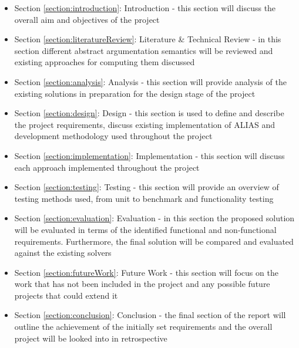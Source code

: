 \begin{itemize}
	\item Section \ref{section:introduction}: Introduction - this section will discuss the overall aim and objectives of the project
	\item Section \ref{section:literatureReview}: Literature \& Technical Review - in this section different abstract argumentation semantics will be reviewed and existing approaches for computing them discussed
	\item Section \ref{section:analysis}: Analysis - this section will provide analysis of the existing solutions in preparation for the design stage of the project
	\item Section \ref{section:design}: Design - this section is used to define and describe the project requirements, discuss existing implementation of ALIAS and development methodology used throughout the project
	\item Section \ref{section:implementation}: Implementation - this section will discuss each approach implemented throughout the project
	\item Section \ref{section:testing}: Testing - this section will provide an overview of testing methods used, from unit to benchmark and functionality testing
	\item Section \ref{section:evaluation}: Evaluation - in this section the proposed solution will be evaluated in terms of the identified functional and non-functional requirements. Furthermore, the final solution will be compared and evaluated against the existing solvers	\item Section \ref{section:futureWork}: Future Work - this section will focus on the work that has not been included in the project and any possible future projects that could extend it
	\item Section \ref{section:conclusion}: Conclusion - the final section of the report will outline the achievement of the initially set requirements and the overall project will be looked into in retrospective 
\end{itemize}
